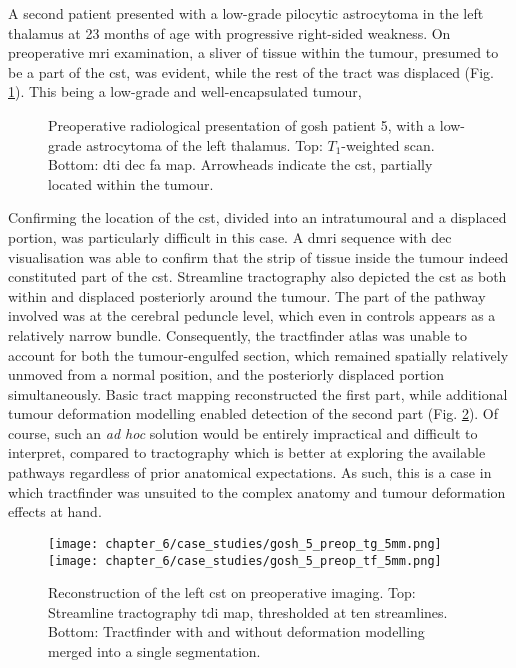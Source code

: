 A second patient presented with a low-grade pilocytic astrocytoma in the left thalamus at 23 months of age with progressive right-sided weakness.
On preoperative \gls{mri} examination, a sliver of tissue within the tumour, presumed to be a part of the \gls{cst}, was evident, while the rest of the tract was displaced (Fig. \ref{fig:5p}).
This being a low-grade and well-encapsulated tumour,

\begin{figure}[htb!]
  \centering
  
  
  \caption{Preoperative radiological presentation of \gls{gosh} patient 5, with a low-grade astrocytoma of the left thalamus. Top: $T_1$-weighted scan. Bottom: \gls{dti} \gls{dec} \gls{fa} map. Arrowheads indicate the \gls{cst}, partially located within the tumour.}
  \label{fig:5p}
\end{figure}

Confirming the location of the \gls{cst}, divided into an intratumoural and a displaced portion, was particularly difficult in this case.
A \gls{dmri} sequence with \gls{dec} visualisation was able to confirm that the strip of tissue inside the tumour indeed constituted part of the \gls{cst}.
Streamline tractography also depicted the \gls{cst} as both within and displaced posteriorly around the tumour.
The part of the pathway involved was at the cerebral peduncle level, which even in controls appears as a relatively narrow bundle.
Consequently, the tractfinder atlas was unable to account for both the tumour-engulfed section, which remained spatially relatively unmoved from a normal position, and the posteriorly displaced portion simultaneously.
Basic tract mapping reconstructed the first part, while additional tumour deformation modelling enabled detection of the second part (Fig. \ref{fig:5p_cst}).
Of course, such an \textit{ad hoc} solution would be entirely impractical and difficult to interpret, compared to tractography which is better at exploring the available pathways regardless of prior anatomical expectations.
As such, this is a case in which tractfinder was unsuited to the complex anatomy and tumour deformation effects at hand.

\begin{figure}[htb!]
  \centering
  \texttt{[image: chapter\_6/case\_studies/gosh\_5\_preop\_tg\_5mm.png]}
  \texttt{[image: chapter\_6/case\_studies/gosh\_5\_preop\_tf\_5mm.png]}
  \caption{Reconstruction of the left \gls{cst} on preoperative imaging. Top: Streamline tractography \gls{tdi} map, thresholded at ten streamlines. Bottom: Tractfinder with and without deformation modelling merged into a single segmentation.}
  \label{fig:5p_cst}
\end{figure}

